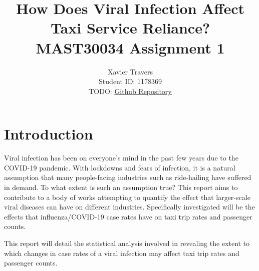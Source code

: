 \documentclass[11pt]{article}
\title{\textbf{How Does Viral Infection Affect Taxi Service Reliance?} \\ 
MAST30034 Assignment 1}
\author{
Xavier Travers \\
Student ID: 1178369 \\
TODO: \href{https://github.com/MAST30034-Applied-Data-Science/mast30034\_p1\_template/tree/fd9f1dd17fdbcb5b119b70c93a22da8210d44fd7}{Github Repository}
}
\begin{document}
\maketitle

\section{Introduction}

Viral infection has been on everyone's mind in the past few years due to the COVID-19 pandemic.
With lockdowns and fears of infection, 
it is a natural assumption that many people-facing industries such as ride-hailing have suffered in demand.
To what extent is such an assumption true?
This report aims to contribute to a body of works attempting to quantify the effect that larger-scale viral diseases can have on different industries.
Specifically investigated will be the effects that influenza/COVID-19 case rates have on taxi trip rates and passenger counts.

This report will detail the statistical analysis involved in revealing the extent to which changes in case rates of a viral infection may affect taxi trip rates and passenger counts.
\end{document}
